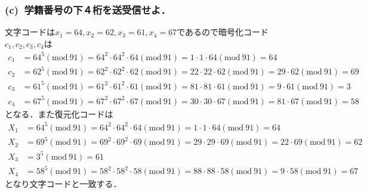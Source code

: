 \documentclass[a4paper,12pt]{jarticle}
\begin{document}
\subsubsection*{(c)~学籍番号の下４桁を送受信せよ．}
\vspace{-4mm}
文字コードは$x_1=64,x_2=62,x_3=61,x_4=67$であるので暗号化コード
$c_1,c_2,c_3,c_4$は
%
\begin{align*}
 c_1&=64^5(\mathrm{mod}~91)=64^2\cdot64^2\cdot64(\mathrm{mod}~91)=1\cdot1\cdot64(\mathrm{mod}~91)=64\\
 c_2&=62^5(\mathrm{mod}~91)=62^2\cdot62^2\cdot62(\mathrm{mod}~91)=22\cdot22\cdot62(\mathrm{mod}~91)=29\cdot62(\mathrm{mod}~91)=69\\
 c_3&=61^5(\mathrm{mod}~91)=61^2\cdot61^2\cdot61(\mathrm{mod}~91)=81\cdot81\cdot61(\mathrm{mod}~91)=9\cdot61(\mathrm{mod}~91)=3\\
 c_4&=67^5(\mathrm{mod}~91)=67^2\cdot67^2\cdot67(\mathrm{mod}~91)=30\cdot30\cdot67(\mathrm{mod}~91)=81\cdot67(\mathrm{mod}~91)=58
\end{align*}
%
となる．また復元化コードは
%
\begin{align*}
 X_1&=64^5(\mathrm{mod}~91)=64^2\cdot64^2\cdot64(\mathrm{mod}~91)=1\cdot1\cdot64(\mathrm{mod}~91)=64\\
 X_2&=69^5(\mathrm{mod}~91)=69^2\cdot69^2\cdot69(\mathrm{mod}~91)=29\cdot29\cdot69(\mathrm{mod}~91)=22\cdot69(\mathrm{mod}~91)=62\\
 X_3&=3^5(\mathrm{mod}~91)=61\\
 X_4&=58^5(\mathrm{mod}~91)=58^2\cdot58^2\cdot58(\mathrm{mod}~91)=88\cdot88\cdot58(\mathrm{mod}~91)=9\cdot58(\mathrm{mod}~91)=67
\end{align*}
%
となり文字コードと一致する．
\end{document}
